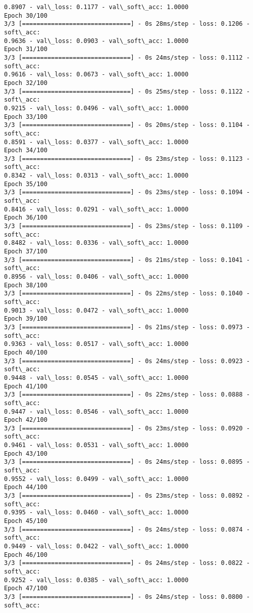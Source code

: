 \documentclass[11pt]{article}
\begin{document}
\begin{Verbatim}[commandchars=\\\{\}]
0.8907 - val\_loss: 0.1177 - val\_soft\_acc: 1.0000
Epoch 30/100
3/3 [==============================] - 0s 28ms/step - loss: 0.1206 - soft\_acc:
0.9636 - val\_loss: 0.0903 - val\_soft\_acc: 1.0000
Epoch 31/100
3/3 [==============================] - 0s 24ms/step - loss: 0.1112 - soft\_acc:
0.9616 - val\_loss: 0.0673 - val\_soft\_acc: 1.0000
Epoch 32/100
3/3 [==============================] - 0s 25ms/step - loss: 0.1122 - soft\_acc:
0.9215 - val\_loss: 0.0496 - val\_soft\_acc: 1.0000
Epoch 33/100
3/3 [==============================] - 0s 20ms/step - loss: 0.1104 - soft\_acc:
0.8591 - val\_loss: 0.0377 - val\_soft\_acc: 1.0000
Epoch 34/100
3/3 [==============================] - 0s 23ms/step - loss: 0.1123 - soft\_acc:
0.8342 - val\_loss: 0.0313 - val\_soft\_acc: 1.0000
Epoch 35/100
3/3 [==============================] - 0s 23ms/step - loss: 0.1094 - soft\_acc:
0.8416 - val\_loss: 0.0291 - val\_soft\_acc: 1.0000
Epoch 36/100
3/3 [==============================] - 0s 23ms/step - loss: 0.1109 - soft\_acc:
0.8482 - val\_loss: 0.0336 - val\_soft\_acc: 1.0000
Epoch 37/100
3/3 [==============================] - 0s 21ms/step - loss: 0.1041 - soft\_acc:
0.8956 - val\_loss: 0.0406 - val\_soft\_acc: 1.0000
Epoch 38/100
3/3 [==============================] - 0s 22ms/step - loss: 0.1040 - soft\_acc:
0.9013 - val\_loss: 0.0472 - val\_soft\_acc: 1.0000
Epoch 39/100
3/3 [==============================] - 0s 21ms/step - loss: 0.0973 - soft\_acc:
0.9363 - val\_loss: 0.0517 - val\_soft\_acc: 1.0000
Epoch 40/100
3/3 [==============================] - 0s 24ms/step - loss: 0.0923 - soft\_acc:
0.9448 - val\_loss: 0.0545 - val\_soft\_acc: 1.0000
Epoch 41/100
3/3 [==============================] - 0s 22ms/step - loss: 0.0888 - soft\_acc:
0.9447 - val\_loss: 0.0546 - val\_soft\_acc: 1.0000
Epoch 42/100
3/3 [==============================] - 0s 23ms/step - loss: 0.0920 - soft\_acc:
0.9461 - val\_loss: 0.0531 - val\_soft\_acc: 1.0000
Epoch 43/100
3/3 [==============================] - 0s 24ms/step - loss: 0.0895 - soft\_acc:
0.9552 - val\_loss: 0.0499 - val\_soft\_acc: 1.0000
Epoch 44/100
3/3 [==============================] - 0s 23ms/step - loss: 0.0892 - soft\_acc:
0.9395 - val\_loss: 0.0460 - val\_soft\_acc: 1.0000
Epoch 45/100
3/3 [==============================] - 0s 24ms/step - loss: 0.0874 - soft\_acc:
0.9449 - val\_loss: 0.0422 - val\_soft\_acc: 1.0000
Epoch 46/100
3/3 [==============================] - 0s 24ms/step - loss: 0.0822 - soft\_acc:
0.9252 - val\_loss: 0.0385 - val\_soft\_acc: 1.0000
Epoch 47/100
3/3 [==============================] - 0s 24ms/step - loss: 0.0800 - soft\_acc:

\end{Verbatim}
\end{document}

